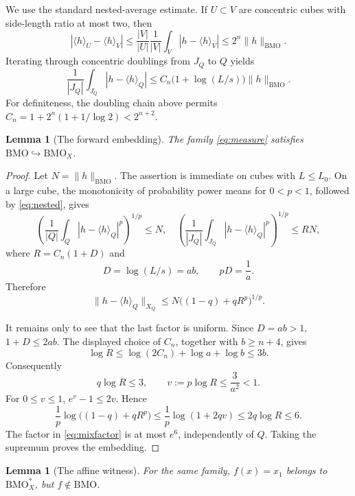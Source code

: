 \documentclass[10pt]{article}
\newtheorem{lemma}[theorem]{Lemma}
\newcommand{\BMO}{\mathrm{BMO}}
\newcommand{\avg}[1]{\langle #1\rangle}
\begin{document}
We use the standard nested-average estimate.  If $U\subset V$ are
concentric cubes with side-length ratio at most two, then
\[
 |\avg h_U-\avg h_V|
 \le \frac{|V|}{|U|}\frac1{|V|}\int_V|h-\avg h_V|
 \le2^n\|h\|_{\BMO}.
\]
Iterating through concentric doublings from $J_Q$ to $Q$ yields
\begin{equation}\label{eq:nested}
 \frac1{|J_Q|}\int_{J_Q}|h-\avg h_Q|
 \le C_n\bigl(1+\log(L/s)\bigr)\|h\|_{\BMO}.
\end{equation}
For definiteness, the doubling chain above permits
\(C_n=1+2^n(1+1/\log2)<2^{n+2}\).

\begin{lemma}[The forward embedding]\label{lem:forward}
The family \eqref{eq:measure} satisfies
\(\BMO\hookrightarrow\BMO_X\).
\end{lemma}

\begin{proof}
Let $N=\|h\|_{\BMO}$.  The assertion is immediate on cubes with
$L\le L_0$.  On a large cube, the monotonicity of probability power means
for $0<p<1$, followed by \eqref{eq:nested}, gives
\[
 \left(\frac1{|Q|}\int_Q|h-\avg h_Q|^p\right)^{1/p}\le N,
 \quad
 \left(\frac1{|J_Q|}\int_{J_Q}|h-\avg h_Q|^p\right)^{1/p}
 \le RN,
\]
where $R=C_n(1+D)$ and
\begin{equation}\label{eq:D}
 D=\log(L/s)=ab,\qquad pD=\frac1a.
\end{equation}
Therefore
\begin{equation}\label{eq:mixfactor}
 \|h-\avg h_Q\|_{X_Q}
 \le N\bigl((1-q)+qR^p\bigr)^{1/p}.
\end{equation}

It remains only to see that the last factor is uniform.  Since
\(D=ab>1\), \(1+D\le2ab\).  The displayed choice of $C_n$, together with
\(b\ge n+4\), gives
\[
 \log R\le\log(2C_n)+\log a+\log b\le3b.
\]
Consequently
\[
 q\log R\le3,
 \qquad v:=p\log R\le\frac3{a^2}<1.
\]
For $0\le v\le1$, $e^v-1\le2v$.  Hence
\[
 \frac1p\log\bigl((1-q)+qR^p\bigr)
 \le\frac1p\log(1+2qv)
 \le2q\log R\le6.
\]
The factor in \eqref{eq:mixfactor} is at most $e^6$, independently of
$Q$.  Taking the supremum proves the embedding.
\end{proof}

\begin{lemma}[The affine witness]\label{lem:affine}
For the same family, $f(x)=x_1$ belongs to \(\BMO_X^*\), but
$f\notin\BMO$.
\end{lemma}
\end{document}
